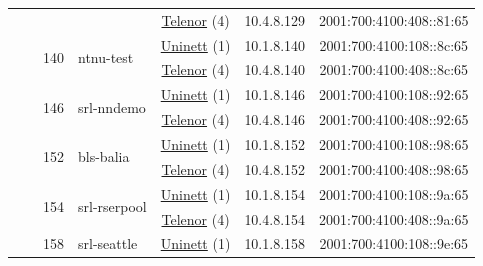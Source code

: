 \begin{small}
\begin{center}
\begin{longtable}{|c|c|c|c|c|c|c|c|}
  &  &  &  & \multicolumn{2}{|c|}{\tiny{\href{https://www.telenor.no}{Telenor} (4)}} & \tiny{10.4.8.129} & \tiny{2001:700:4100:408::81:65} \\* \cline{3-3}\cline{4-4}\cline{5-5}\cline{6-6}\cline{7-7}\cline{8-8}
  &  & \multirow{2}{*}{\tiny{140}} & \multicolumn{1}{|l|}{\multirow{2}{*}{\tiny{ntnu-test}}} & \multicolumn{2}{|c|}{\tiny{\href{https://www.uninett.no}{Uninett} (1)}} & \tiny{10.1.8.140} & \tiny{2001:700:4100:108::8c:65} \\* \cline{5-5}\cline{6-6}\cline{7-7}\cline{8-8}
  &  &  &  & \multicolumn{2}{|c|}{\tiny{\href{https://www.telenor.no}{Telenor} (4)}} & \tiny{10.4.8.140} & \tiny{2001:700:4100:408::8c:65} \\* \cline{3-3}\cline{4-4}\cline{5-5}\cline{6-6}\cline{7-7}\cline{8-8}
  &  & \multirow{2}{*}{\tiny{146}} & \multicolumn{1}{|l|}{\multirow{2}{*}{\tiny{srl-nndemo}}} & \multicolumn{2}{|c|}{\tiny{\href{https://www.uninett.no}{Uninett} (1)}} & \tiny{10.1.8.146} & \tiny{2001:700:4100:108::92:65} \\* \cline{5-5}\cline{6-6}\cline{7-7}\cline{8-8}
  &  &  &  & \multicolumn{2}{|c|}{\tiny{\href{https://www.telenor.no}{Telenor} (4)}} & \tiny{10.4.8.146} & \tiny{2001:700:4100:408::92:65} \\* \cline{3-3}\cline{4-4}\cline{5-5}\cline{6-6}\cline{7-7}\cline{8-8}
  &  & \multirow{2}{*}{\tiny{152}} & \multicolumn{1}{|l|}{\multirow{2}{*}{\tiny{bls-balia}}} & \multicolumn{2}{|c|}{\tiny{\href{https://www.uninett.no}{Uninett} (1)}} & \tiny{10.1.8.152} & \tiny{2001:700:4100:108::98:65} \\* \cline{5-5}\cline{6-6}\cline{7-7}\cline{8-8}
  &  &  &  & \multicolumn{2}{|c|}{\tiny{\href{https://www.telenor.no}{Telenor} (4)}} & \tiny{10.4.8.152} & \tiny{2001:700:4100:408::98:65} \\* \cline{3-3}\cline{4-4}\cline{5-5}\cline{6-6}\cline{7-7}\cline{8-8}
  &  & \multirow{2}{*}{\tiny{154}} & \multicolumn{1}{|l|}{\multirow{2}{*}{\tiny{srl-rserpool}}} & \multicolumn{2}{|c|}{\tiny{\href{https://www.uninett.no}{Uninett} (1)}} & \tiny{10.1.8.154} & \tiny{2001:700:4100:108::9a:65} \\* \cline{5-5}\cline{6-6}\cline{7-7}\cline{8-8}
  &  &  &  & \multicolumn{2}{|c|}{\tiny{\href{https://www.telenor.no}{Telenor} (4)}} & \tiny{10.4.8.154} & \tiny{2001:700:4100:408::9a:65} \\* \cline{3-3}\cline{4-4}\cline{5-5}\cline{6-6}\cline{7-7}\cline{8-8}
  &  & \multirow{2}{*}{\tiny{158}} & \multicolumn{1}{|l|}{\multirow{2}{*}{\tiny{srl-seattle}}} & \multicolumn{2}{|c|}{\tiny{\href{https://www.uninett.no}{Uninett} (1)}} & \tiny{10.1.8.158} & \tiny{2001:700:4100:108::9e:65} \\* \cline{5-5}\cline{6-6}\cline{7-7}\cline{8-8}

\end{longtable}
\end{center}
\end{small}

